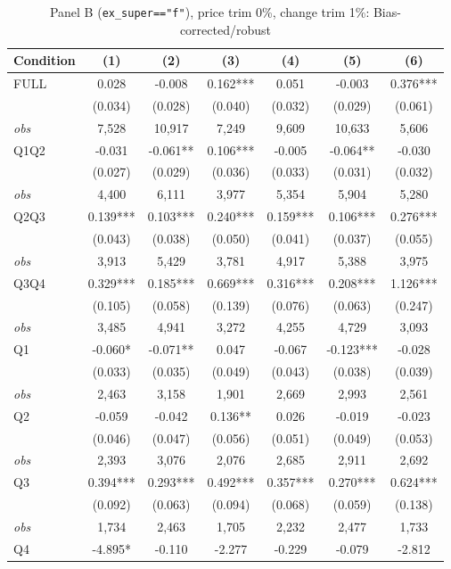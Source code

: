 \begin{table}[!htbp]
\centering
\caption{Panel B (\texttt{ex\_super=="f"}), price trim 0\%, change trim 1\%: Bias-corrected/robust}
\label{tab:b:trim01:robust}
\small
\begin{tabular}{lcccccc}
\toprule
Condition & (1) & (2) & (3) & (4) & (5) & (6) \\
\midrule
FULL & 0.028 & -0.008 & 0.162*** & 0.051 & -0.003 & 0.376*** \\
 & (0.034) & (0.028) & (0.040) & (0.032) & (0.029) & (0.061) \\
\textit{obs} &  7,528 & 10,917 &  7,249 &  9,609 & 10,633 &  5,606 \\
Q1Q2 & -0.031 & -0.061** & 0.106*** & -0.005 & -0.064** & -0.030 \\
 & (0.027) & (0.029) & (0.036) & (0.033) & (0.031) & (0.032) \\
\textit{obs} & 4,400 & 6,111 & 3,977 & 5,354 & 5,904 & 5,280 \\
Q2Q3 & 0.139*** & 0.103*** & 0.240*** & 0.159*** & 0.106*** & 0.276*** \\
 & (0.043) & (0.038) & (0.050) & (0.041) & (0.037) & (0.055) \\
\textit{obs} & 3,913 & 5,429 & 3,781 & 4,917 & 5,388 & 3,975 \\
Q3Q4 & 0.329*** & 0.185*** & 0.669*** & 0.316*** & 0.208*** & 1.126*** \\
 & (0.105) & (0.058) & (0.139) & (0.076) & (0.063) & (0.247) \\
\textit{obs} & 3,485 & 4,941 & 3,272 & 4,255 & 4,729 & 3,093 \\
Q1 & -0.060* & -0.071** & 0.047 & -0.067 & -0.123*** & -0.028 \\
 & (0.033) & (0.035) & (0.049) & (0.043) & (0.038) & (0.039) \\
\textit{obs} & 2,463 & 3,158 & 1,901 & 2,669 & 2,993 & 2,561 \\
Q2 & -0.059 & -0.042 & 0.136** & 0.026 & -0.019 & -0.023 \\
 & (0.046) & (0.047) & (0.056) & (0.051) & (0.049) & (0.053) \\
\textit{obs} & 2,393 & 3,076 & 2,076 & 2,685 & 2,911 & 2,692 \\
Q3 & 0.394*** & 0.293*** & 0.492*** & 0.357*** & 0.270*** & 0.624*** \\
 & (0.092) & (0.063) & (0.094) & (0.068) & (0.059) & (0.138) \\
\textit{obs} & 1,734 & 2,463 & 1,705 & 2,232 & 2,477 & 1,733 \\
Q4 & -4.895* & -0.110 & -2.277 & -0.229 & -0.079 & -2.812 \\

\end{tabular}
\end{table}
